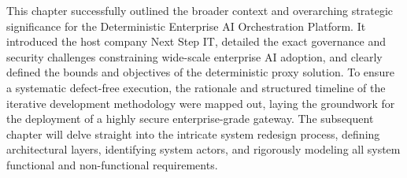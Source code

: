 This chapter successfully outlined the broader context and overarching strategic significance for the Deterministic Enterprise AI Orchestration Platform. It introduced the host company Next Step IT, detailed the exact governance and security challenges constraining wide-scale enterprise AI adoption, and clearly defined the bounds and objectives of the deterministic proxy solution. To ensure a systematic defect-free execution, the rationale and structured timeline of the iterative development methodology were mapped out, laying the groundwork for the deployment of a highly secure enterprise-grade gateway. The subsequent chapter will delve straight into the intricate system redesign process, defining architectural layers, identifying system actors, and rigorously modeling all system functional and non-functional requirements.
